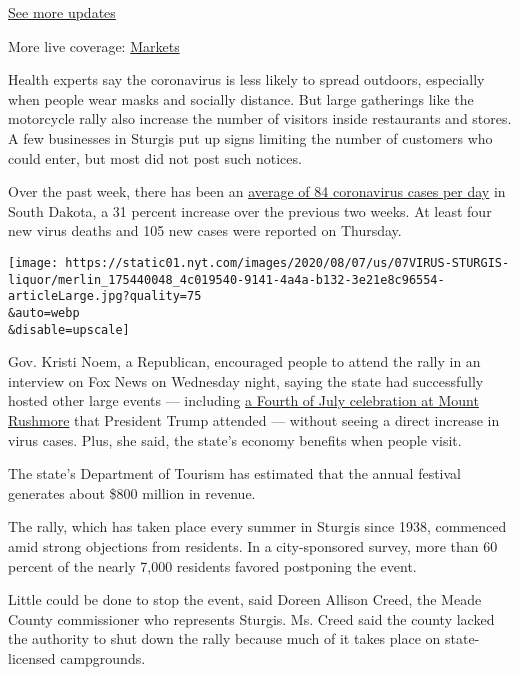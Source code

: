 \href{https://www.nytimes.com/2020/08/07/world/covid-19-news.html?action=click\&pgtype=Article\&state=default\&region=MAIN_CONTENT_1\&context=storylines_live_updates}{See
more updates}

More live coverage:
\href{https://www.nytimes.com/live/2020/08/07/business/stock-market-today-coronavirus?action=click\&pgtype=Article\&state=default\&region=MAIN_CONTENT_1\&context=storylines_live_updates}{Markets}

Health experts say the coronavirus is less likely to spread outdoors,
especially when people wear masks and socially distance. But large
gatherings like the motorcycle rally also increase the number of
visitors inside restaurants and stores. A few businesses in Sturgis put
up signs limiting the number of customers who could enter, but most did
not post such notices.

Over the past week, there has been an
\href{https://www.nytimes.com/interactive/2020/us/south-dakota-coronavirus-cases.html}{average
of 84 coronavirus cases per day} in South Dakota, a 31 percent increase
over the previous two weeks. At least four new virus deaths and 105 new
cases were reported on Thursday.

\texttt{[image: https://static01.nyt.com/images/2020/08/07/us/07VIRUS-STURGIS-liquor/merlin\_175440048\_4c019540-9141-4a4a-b132-3e21e8c96554-articleLarge.jpg?quality=75\\\&auto=webp\\\&disable=upscale]}

Gov. Kristi Noem, a Republican, encouraged people to attend the rally in
an interview on Fox News on Wednesday night, saying the state had
successfully hosted other large events --- including
\href{https://www.nytimes.com/2020/07/03/us/politics/trump-coronavirus-mount-rushmore.html}{a
Fourth of July celebration at Mount Rushmore} that President Trump
attended --- without seeing a direct increase in virus cases. Plus, she
said, the state's economy benefits when people visit.

The state's Department of Tourism has estimated that the annual festival
generates about \$800 million in revenue.

The rally, which has taken place every summer in Sturgis since 1938,
commenced amid strong objections from residents. In a city-sponsored
survey, more than 60 percent of the nearly 7,000 residents favored
postponing the event.

Little could be done to stop the event, said Doreen Allison Creed, the
Meade County commissioner who represents Sturgis. Ms. Creed said the
county lacked the authority to shut down the rally because much of it
takes place on state-licensed campgrounds.

